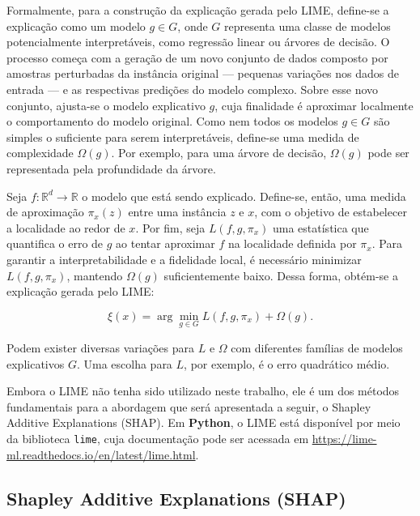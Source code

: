 \documentclass[
  12pt,
  a4paper,
]{scrreprt}
\begin{document}
\vspace{12pt}

Formalmente, para a construção da explicação gerada pelo LIME, define-se
a explicação como um modelo \(g \in G\), onde \(G\) representa uma
classe de modelos potencialmente interpretáveis, como regressão linear
ou árvores de decisão. O processo começa com a geração de um novo
conjunto de dados composto por amostras perturbadas da instância
original --- pequenas variações nos dados de entrada --- e as
respectivas predições do modelo complexo. Sobre esse novo conjunto,
ajusta-se o modelo explicativo \(g\), cuja finalidade é aproximar
localmente o comportamento do modelo original. Como nem todos os modelos
\(g \in G\) são simples o suficiente para serem interpretáveis,
define-se uma medida de complexidade \(\Omega\left(g\right)\). Por
exemplo, para uma árvore de decisão, \(\Omega\left(g\right)\) pode ser
representada pela profundidade da árvore.

\vspace{12pt}

Seja \(f: \mathbb{R}^d \rightarrow \mathbb{R}\) o modelo que está sendo
explicado. Define-se, então, uma medida de aproximação
\(\pi_x\left(z\right)\) entre uma instância \(z\) e \(x\), com o
objetivo de estabelecer a localidade ao redor de \(x\). Por fim, seja
\(L\left(f, g, \pi_x\right)\) uma estatística que quantifica o erro de
\(g\) ao tentar aproximar \(f\) na localidade definida por \(\pi_x\).
Para garantir a interpretabilidade e a fidelidade local, é necessário
minimizar \(L(f, g, \pi_x)\), mantendo \(\Omega(g)\) suficientemente
baixo. Dessa forma, obtém-se a explicação gerada pelo LIME:

\[
\xi\left(x\right) = \arg \min_{g \in G} L\left(f, g, \pi_x\right) + \Omega\left(g\right)\text{.}
\]

Podem exister diversas variações para \(L\) e \(\Omega\) com diferentes
famílias de modelos explicativos \(G\). Uma escolha para \(L\), por
exemplo, é o erro quadrático médio.

\vspace{12pt}

Embora o LIME não tenha sido utilizado neste trabalho, ele é um dos
métodos fundamentais para a abordagem que será apresentada a seguir, o
Shapley Additive Explanations (SHAP). Em \textbf{Python}, o LIME está
disponível por meio da biblioteca \texttt{lime}, cuja documentação pode
ser acessada em
\url{https://lime-ml.readthedocs.io/en/latest/lime.html}.

\subsection{Shapley Additive Explanations
(SHAP)}\label{shapley-additive-explanations-shap}
\end{document}
